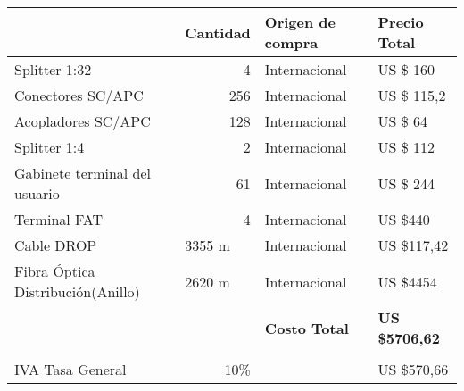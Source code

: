 \begin{table}[H]
  \centering

    \begin{tabular}{rr|l|l|}
    \hline
    \rowcolor[HTML]{C5D9F1} \multicolumn{1}{|l|}{\textbf{Descripción }} & \multicolumn{1}{l|}{\textbf{Cantidad}} & \textbf{Origen de compra} & \textbf{Precio Total} \bigstrut\\
    \hline
    \multicolumn{1}{|l|}{Splitter 1:32} & 4     & Internacional & US \$ 160 \bigstrut\\
    \hline
    \multicolumn{1}{|l|}{Conectores SC/APC} & 256   & Internacional & US \$ 115,2 \bigstrut\\
    \hline
    \multicolumn{1}{|l|}{Acopladores SC/APC} & 128   & Internacional & US \$ 64 \bigstrut\\
    \hline
    \multicolumn{1}{|l|}{Splitter 1:4} & 2     & Internacional & US \$ 112 \bigstrut\\
    \hline
    \multicolumn{1}{|l|}{Gabinete terminal del usuario} & 61    & Internacional & US \$ 244 \bigstrut\\
    \hline
    \multicolumn{1}{|l|}{Terminal FAT} & 4     & Internacional & US \$440 \bigstrut\\
    \hline
    \multicolumn{1}{|l|}{Cable DROP} & \multicolumn{1}{l|}{3355 m} & Internacional & US \$117,42 \bigstrut\\
    \hline
    \multicolumn{1}{|l|}{Fibra Óptica Distribución(Anillo)} & \multicolumn{1}{l|}{2620 m} & Internacional & US \$4454 \bigstrut\\
    \hline
    \multicolumn{1}{|r|}{} &       & \textbf{Costo Total} & \textbf{US \$5706,62} \bigstrut\\
    \hline
    \rowcolor[HTML]{C5D9F1} \multicolumn{1}{l}{\textbf{Costo de Importación}} & \multicolumn{1}{r}{} & \multicolumn{1}{r}{} & \multicolumn{1}{r}{} \bigstrut\\
    \hline
    \multicolumn{1}{|l|}{IVA Tasa General} & 10\%  &       & US \$570,66 \bigstrut\\
    \hline

\end{tabular}
\end{table}
